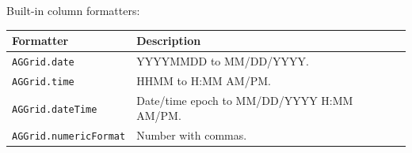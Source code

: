\noindent
Built-in column formatters:

\begin{longtable}{P{4.8cm}P{5.7cm}}
\toprule
\textbf{Formatter} & \textbf{Description} \\
\midrule
\endhead
\texttt{AGGrid.date} & YYYYMMDD to MM/DD/YYYY. \\
\texttt{AGGrid.time} & HHMM to H:MM AM/PM. \\
\texttt{AGGrid.dateTime} & Date/time epoch to MM/DD/YYYY H:MM AM/PM. \\
\texttt{AGGrid.numericFormat} & Number with commas. \\
\bottomrule
\end{longtable}
